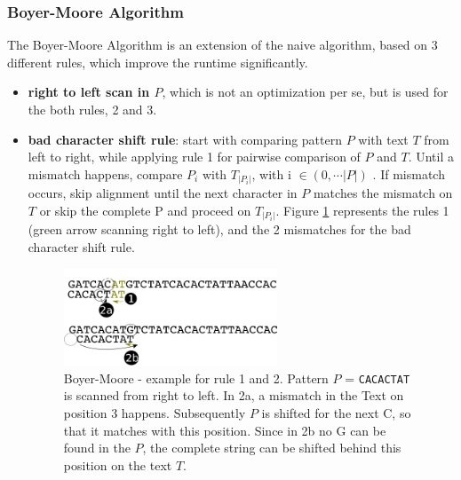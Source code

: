 \subsubsection{Boyer-Moore Algorithm}
The Boyer-Moore Algorithm is an extension of the naive algorithm, based on 3 different rules, which improve the runtime significantly. 
\begin{itemize}
\item[1] \textbf{right to left scan in $P$}, which is not an optimization per se, but is used for the both rules, 2 and 3. 
\item[2] \textbf{bad character shift rule}: start with comparing pattern $P$ with text $T$ from left to right, while applying rule 1 for pairwise comparison of $P$ and $T$. Until a mismatch happens, compare $P_i$ with $T_{|P_i|}$, with i $\in (0,\cdots |P|)$ . If mismatch occurs, skip alignment until the next character in $P$ matches the mismatch on $T$ or skip the complete P and proceed on $T_{|P_i|}$. Figure \ref{fig:boyer2} represents the rules 1 (green arrow scanning right to left), and the 2 mismatches for the bad character shift rule.
\begin{figure}[!ht]
\label{fig:boyer2}
    \centering
    \includegraphics[width=0.6\textwidth]{images/boyer2.png}
    \caption[Boyer-Moore - example rule 1 and 2]{Boyer-Moore - example for rule 1 and 2. Pattern $P$ = \texttt{CACACTAT} is scanned from right to left. In 2a, a mismatch in the Text on position 3 happens. Subsequently $P$ is shifted for the next C, so that it matches with this position. Since in 2b no G can be found in the $P$, the complete string can be shifted behind this position on the text $T$.} 

\end{figure}


\end{itemize}

